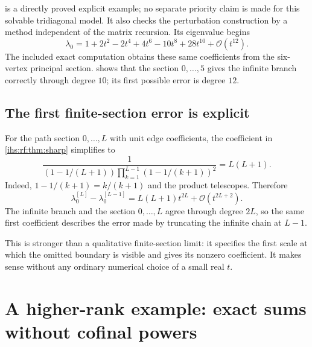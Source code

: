 \documentclass[11pt,a4paper]{article}
\numberwithin{equation}{section}
\theoremstyle{definition}
\theoremstyle{remark}
\newcommand{\bigo}{\mathcal O}
\begin{document}
 is a directly proved explicit example; no separate
priority claim is made for this solvable tridiagonal model. It also checks
the perturbation construction by a method independent of the matrix
recursion. Its eigenvalue begins
\begin{equation}\label{ihs:rf:eq:chainjet}
 \lambda_0=1+2t^2-2t^4+4t^6-10t^8+28t^{10}+\bigo(t^{12}).
\end{equation}
The included exact computation obtains these same coefficients from the
six-vertex principal section.  shows that the
section $0,\ldots,5$ gives the infinite branch correctly through degree
$10$; its first possible error is degree $12$.

\subsection{The first finite-section error is explicit}\label{ihs:rf:sec:chainerror}

For the path section $0,\ldots,L$ with unit edge coefficients, the
coefficient in \cref{ihs:rf:thm:sharp} simplifies to
\[
 \frac1{(1-1/(L+1))\prod_{k=1}^{L-1}(1-1/(k+1))^2}=L(L+1).
\]
Indeed, $1-1/(k+1)=k/(k+1)$ and the product telescopes. Therefore
\begin{equation}\label{ihs:rf:eq:chainerror}
 \lambda_0^{[L]}-\lambda_0^{[L-1]}=L(L+1)t^{2L}+\bigo(t^{2L+2}).
\end{equation}
The infinite branch and the section $0,\ldots,L$ agree through degree $2L$,
so the same first coefficient describes the error made by truncating the
infinite chain at $L-1$.

This is stronger than a qualitative finite-section limit: it specifies the
first scale at which the omitted boundary is visible and gives its nonzero
coefficient. It makes sense without any ordinary numerical choice of a small
real $t$.

\section{A higher-rank example: exact sums without cofinal powers}\label{ihs:sec:ranktwo}
\end{document}
